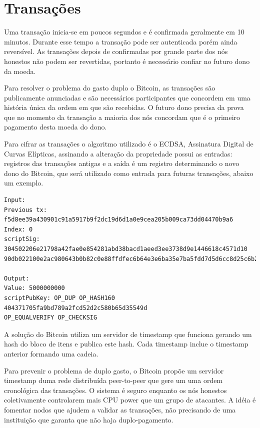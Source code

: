 \documentclass[a4paper,11pt]{article}
\theoremstyle{mytheor}
\begin{document}
\section*{Transações}

Uma transação inicia-se em poucos segundos e é confirmada geralmente em 10 minutos. Durante esse tempo a transação pode ser autenticada porém ainda reversível. As transações depois de confirmadas por grande parte dos nós honestos não podem ser revertidas, portanto é necessário confiar no futuro dono da moeda.

Para resolver o problema do gasto duplo o Bitcoin, as transações são publicamente anunciadas e são necessários participantes que concordem em uma história única da ordem em que são recebidas. O futuro dono precisa da prova que no momento da transação a maioria dos nós concordam que é o primeiro pagamento desta moeda do dono.

Para cifrar as transações o algoritmo utilizado é o  ECDSA, Assinatura Digital de Curvas Elípticas, assinando a alteração da propriedade possui as entradas: registros das transações antigas e a saída é um registro determinando o novo dono do Bitcoin, que será utilizado como entrada para futuras transações, abaixo um exemplo.

\begin{lstlisting}[Exemplo de uma transação Bitcoin com uma entrada e uma saída apenas]
Input:
Previous tx: f5d8ee39a430901c91a5917b9f2dc19d6d1a0e9cea205b009ca73dd04470b9a6
Index: 0
scriptSig: 304502206e21798a42fae0e854281abd38bacd1aeed3ee3738d9e1446618c4571d10
90db022100e2ac980643b0b82c0e88ffdfec6b64e3e6ba35e7ba5fdd7d5d6cc8d25c6b241501

Output:
Value: 5000000000
scriptPubKey: OP_DUP OP_HASH160 404371705fa9bd789a2fcd52d2c580b65d35549d
OP_EQUALVERIFY OP_CHECKSIG
\end{lstlisting}

A solução do Bitcoin utiliza um servidor de timestamp que funciona gerando um hash do bloco de itens e publica este hash. Cada timestamp inclue o timestamp anterior formando uma cadeia.

Para prevenir o problema de duplo gasto, o Bitcoin propõe um servidor timestamp duma rede distribuída peer-to-peer que gere um uma ordem cronológica das transações. O sistema é seguro enquanto os nós honestos coletivamente controlarem mais CPU power que um grupo de atacantes. A idéia é fomentar nodos que ajudem a validar as transações, não precisando de uma instituição que garanta que não haja duplo-pagamento.
\end{document}
